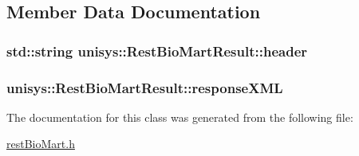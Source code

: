 \subsection{Member Data Documentation}
\hypertarget{classunisys_1_1RestBioMartResult_a811e33f63dbd761d2723db52825ba525}{
\subsubsection[{header}]{\setlength{\rightskip}{0pt plus 5cm}std\-::string unisys\-::\-Rest\-Bio\-Mart\-Result\-::header\hspace{0.3cm}{\ttfamily [private]}}}\label{classunisys_1_1RestBioMartResult_a811e33f63dbd761d2723db52825ba525}
\hypertarget{classunisys_1_1RestBioMartResult_a89a1ffbddcdc023cbe55576a03ebb82d}{
\subsubsection[{response\-X\-M\-L}]{ unisys\-::\-Rest\-Bio\-Mart\-Result\-::response\-X\-M\-L\hspace{0.3cm}{\ttfamily [private]}}}\label{classunisys_1_1RestBioMartResult_a89a1ffbddcdc023cbe55576a03ebb82d}


The documentation for this class was generated from the following file\-:\begin{DoxyCompactItemize}
\item 
\hyperlink{restBioMart_8h}{rest\-Bio\-Mart.\-h}\end{DoxyCompactItemize}

